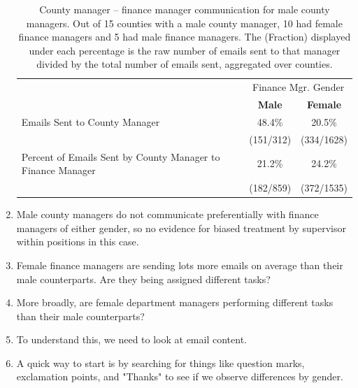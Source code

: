 \documentclass[fleqn]{MJDArticle}
\begin{document}
\begin{enumerate}
	
	\begin{table}[H]
	\centering
		\begin{tabular}{m{2in}cc}
		\toprule
		& \multicolumn{2}{c}{Finance Mgr. Gender} \\
	& \textbf{Male} & \textbf{Female}  \\
		 \midrule
		 Emails Sent to County Manager & 48.4\%& 20.5\% \\
		  & (151/312) & (334/1628)\\
		 Percent of Emails Sent by County Manager to Finance Manager & 21.2\% & 24.2\% \\
		  & (182/859) & (372/1535)\\
		\bottomrule
		\end{tabular}
		\caption{\label{tab:finance stats}County manager -- finance manager communication for male county managers. Out of 15 counties with a male county manager, 10 had female finance managers and 5 had male finance managers. The (Fraction) displayed under each percentage is the raw number of emails sent to that manager divided by the total number of emails sent, aggregated over counties. }
	\end{table}
	
	\item Male county managers do not communicate preferentially with finance managers of either gender, so no evidence for biased treatment by supervisor within positions in this case. 
	\item Female finance managers are sending lots more emails on average than their male counterparts. Are they being assigned different tasks? 
	\item More broadly, are female department managers performing different tasks than their male counterparts?
	\item To understand this, we need to look at email content. 
	\item A quick way to start is by searching for things like question marks, exclamation points, and "Thanks" to see if we observe differences by gender.
	
	
	

\end{enumerate}
\end{document}
